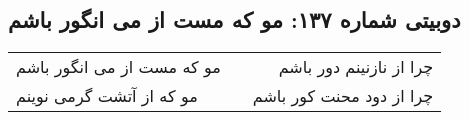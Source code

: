 \begin{center}
\section*{دوبیتی شماره ۱۳۷: مو که مست از می انگور باشم}
\label{sec:137}
\begin{longtable}{l p{0.5cm} r}
مو که مست از می انگور باشم
&&
چرا از نازنینم دور باشم
\\
مو که از آتشت گرمی نوینم
&&
چرا از دود محنت کور باشم
\\
\end{longtable}
\end{center}
